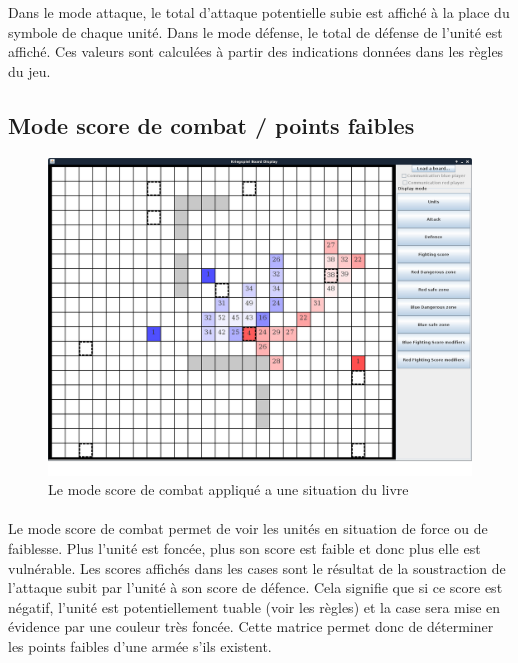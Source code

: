 			Dans le mode attaque, le total d'attaque potentielle subie est affiché à la place du symbole de chaque unité.
			Dans le mode défense, le total de défense de l'unité est affiché.
			Ces valeurs sont calculées à partir des indications données dans les règles du jeu.
			\clearpage	

		\subsection{Mode score de combat / points faibles}

			\begin{figure}[!h]
				\centerline{\includegraphics[scale=0.35]{images/screen_fscore.png}}
				\caption{Le mode score de combat appliqué a une situation du livre}
			\end{figure}
			
			\paragraph{}
			Le mode score de combat permet de voir les unités en situation de force ou de faiblesse.
			Plus l'unité est foncée, plus son score est faible et donc plus elle est vulnérable.
                        Les scores affichés dans les cases sont le résultat de la soustraction de l'attaque subit par l'unité à son score de défence. Cela signifie que si ce score est négatif, l'unité est potentiellement tuable (voir les règles) et la case sera mise en évidence par une couleur très foncée.
			Cette matrice permet donc de déterminer les points faibles d'une armée s'ils existent.
			
